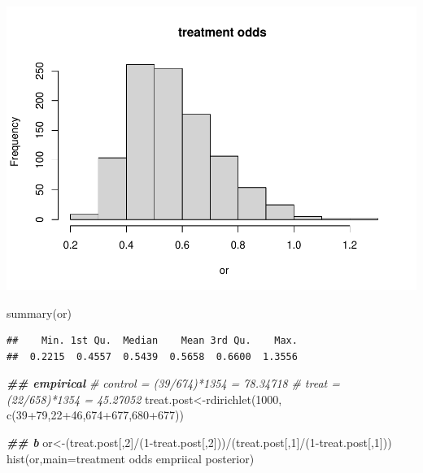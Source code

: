 \documentclass[
]{book}
\newenvironment{Shaded}{\begin{snugshade}}{\end{snugshade}}
\newcommand{\AttributeTok}[1]{\textcolor[rgb]{0.77,0.63,0.00}{#1}}
\newcommand{\CommentTok}[1]{\textcolor[rgb]{0.56,0.35,0.01}{\textit{#1}}}
\newcommand{\DecValTok}[1]{\textcolor[rgb]{0.00,0.00,0.81}{#1}}
\newcommand{\DocumentationTok}[1]{\textcolor[rgb]{0.56,0.35,0.01}{\textbf{\textit{#1}}}}
\newcommand{\FunctionTok}[1]{\textcolor[rgb]{0.00,0.00,0.00}{#1}}
\newcommand{\NormalTok}[1]{#1}
\newcommand{\OtherTok}[1]{\textcolor[rgb]{0.56,0.35,0.01}{#1}}
\newcommand{\SpecialCharTok}[1]{\textcolor[rgb]{0.00,0.00,0.00}{#1}}
\newcommand{\StringTok}[1]{\textcolor[rgb]{0.31,0.60,0.02}{#1}}
\theoremstyle{definition}
\theoremstyle{definition}
\theoremstyle{definition}
\theoremstyle{definition}
\theoremstyle{remark}
\begin{document}
\includegraphics{_main_files/figure-latex/unnamed-chunk-38-1.pdf}

\begin{Shaded}
\begin{Highlighting}[]
  \FunctionTok{summary}\NormalTok{(or)}
\end{Highlighting}
\end{Shaded}

\begin{verbatim}
##    Min. 1st Qu.  Median    Mean 3rd Qu.    Max. 
##  0.2215  0.4557  0.5439  0.5658  0.6600  1.3556
\end{verbatim}

\begin{Shaded}
\begin{Highlighting}[]
  \DocumentationTok{\#\# empirical}
  \CommentTok{\# control = (39/674)*1354 = 78.34718}
  \CommentTok{\# treat = (22/658)*1354 = 45.27052}
\NormalTok{  treat.post}\OtherTok{\textless{}{-}}\FunctionTok{rdirichlet}\NormalTok{(}\DecValTok{1000}\NormalTok{, }\FunctionTok{c}\NormalTok{(}\DecValTok{39}\SpecialCharTok{+}\DecValTok{79}\NormalTok{,}\DecValTok{22}\SpecialCharTok{+}\DecValTok{46}\NormalTok{,}\DecValTok{674}\SpecialCharTok{+}\DecValTok{677}\NormalTok{,}\DecValTok{680}\SpecialCharTok{+}\DecValTok{677}\NormalTok{))}
 
  
  \DocumentationTok{\#\# b}
\NormalTok{  or}\OtherTok{\textless{}{-}}\NormalTok{(treat.post[,}\DecValTok{2}\NormalTok{]}\SpecialCharTok{/}\NormalTok{(}\DecValTok{1}\SpecialCharTok{{-}}\NormalTok{treat.post[,}\DecValTok{2}\NormalTok{]))}\SpecialCharTok{/}\NormalTok{(treat.post[,}\DecValTok{1}\NormalTok{]}\SpecialCharTok{/}\NormalTok{(}\DecValTok{1}\SpecialCharTok{{-}}\NormalTok{treat.post[,}\DecValTok{1}\NormalTok{]))}
  \FunctionTok{hist}\NormalTok{(or,}\AttributeTok{main=}\StringTok{\textquotesingle{}treatment odds empriical posterior\textquotesingle{}}\NormalTok{)}
\end{Highlighting}
\end{Shaded}
\end{document}
